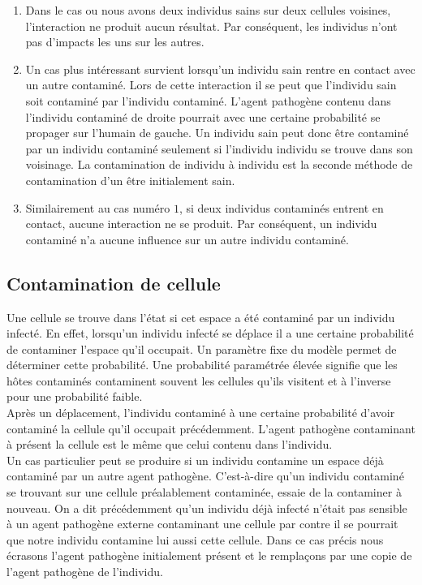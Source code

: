 \begin{enumerate}
	\item Dans le cas ou nous avons deux individus sains sur deux cellules voisines, l'interaction ne produit aucun résultat. Par conséquent, les individus n'ont pas d’impacts les uns sur les autres.
	\item Un cas plus intéressant survient lorsqu'un individu sain rentre en contact avec un autre contaminé. Lors de cette interaction il se peut que l'individu sain soit contaminé par l'individu contaminé. L'agent pathogène contenu dans l'individu contaminé de droite pourrait avec une certaine probabilité se propager sur l'humain de gauche. Un individu sain peut donc être contaminé par un individu contaminé seulement si l'individu individu se trouve dans son voisinage. La contamination de individu à individu est la seconde méthode de contamination d'un être initialement sain.
	\item Similairement au cas numéro $1$, si deux individus contaminés entrent en contact, aucune interaction ne se produit. Par conséquent, un individu contaminé n'a aucune influence sur un autre individu contaminé.
\end{enumerate}

\subsection{Contamination de cellule}

Une cellule se trouve dans l'état si cet espace a été contaminé par un individu infecté. En effet, lorsqu’un individu infecté se déplace il a une certaine probabilité de contaminer l'espace qu'il occupait. Un paramètre fixe du modèle permet de déterminer cette probabilité. Une probabilité paramétrée élevée signifie que les hôtes contaminés contaminent souvent les cellules qu'ils visitent et à l'inverse pour une probabilité faible.\\

Après un déplacement, l'individu contaminé à une certaine probabilité d'avoir contaminé la cellule qu'il occupait précédemment. L'agent pathogène contaminant à présent la cellule est le même que celui contenu dans l'individu.\\

Un cas particulier peut se produire si un individu contamine un espace déjà contaminé par un autre agent pathogène. C'est-à-dire qu'un individu contaminé se trouvant sur une cellule préalablement contaminée, essaie de la contaminer à nouveau. On a dit précédemment qu'un individu déjà infecté n'était pas sensible à un agent pathogène externe contaminant une cellule par contre il se pourrait que notre individu contamine lui aussi cette cellule. Dans ce cas précis nous écrasons l'agent pathogène initialement présent et le remplaçons par une copie de l'agent pathogène de l'individu.

